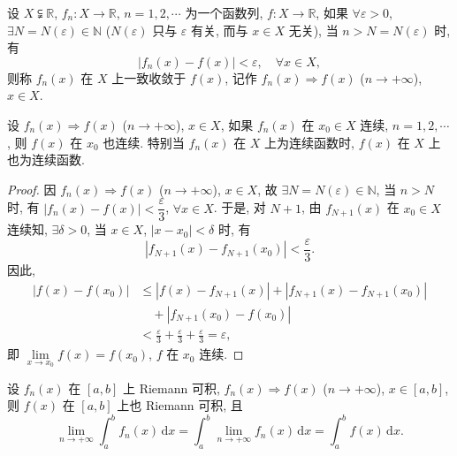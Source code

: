 \begin{definition}\label{def:6.3.1}
设 $X\subsetneqq\mathbb{R}$, $f_{n}:X\to\mathbb{R}$, $n=1,2,\cdots$ 为一个函数列, $f:X\to\mathbb{R}$, 如果 $\forall\varepsilon>0$, $\exists N=N(\varepsilon)\in\mathbb{N}$ ($N(\varepsilon)$ 只与 $\varepsilon$ 有关, 而与 $x\in X$ 无关), 当 $n>N=N(\varepsilon)$ 时, 有
\[
|f_{n}(x)-f(x)|<\varepsilon,\quad\forall x\in X,
\]
则称 $f_{n}(x)$ 在 $X$ 上一致收敛于 $f(x)$, 记作 $f_{n}(x)\Rightarrow f(x)$ ($n\to+\infty$), $x\in X$.
\end{definition}

\begin{theorem}\label{thm:6.3.5}
设 $f_{n}(x)\Rightarrow f(x)$ ($n\to+\infty$), $x\in X$, 如果 $f_{n}(x)$ 在 $x_{0}\in X$ 连续, $n=1,2,\cdots$, 则 $f(x)$ 在 $x_{0}$ 也连续. 特别当 $f_{n}(x)$ 在 $X$ 上为连续函数时, $f(x)$ 在 $X$ 上也为连续函数.
\end{theorem}

\begin{proof}
因 $f_{n}(x)\Rightarrow f(x)$ ($n\to+\infty$), $x\in X$, 故 $\exists N=N(\varepsilon)\in\mathbb{N}$, 当 $n>N$ 时, 有 $|f_{n}(x)-f(x)|<\dfrac{\varepsilon}{3}$, $\forall x\in X$. 于是, 对 $N+1$, 由 $f_{N+1}(x)$ 在 $x_{0}\in X$ 连续知, $\exists\delta>0$, 当 $x\in X$, $|x-x_{0}|<\delta$ 时, 有
\[
|f_{N+1}(x)-f_{N+1}(x_{0})|<\frac{\varepsilon}{3}.
\]
因此,
\[
\begin{aligned}
|f(x)-f(x_{0})|&\leqslant|f(x)-f_{N+1}(x)|+|f_{N+1}(x)-f_{N+1}(x_{0})|\\
&\quad+|f_{N+1}(x_{0})-f(x_{0})|\\
&<\frac{\varepsilon}{3}+\frac{\varepsilon}{3}+\frac{\varepsilon}{3}=\varepsilon,
\end{aligned}
\]
即 $\lim\limits_{x\to x_{0}}f(x)=f(x_{0})$, $f$ 在 $x_{0}$ 连续.
\end{proof}

\begin{theorem}\label{thm:6.3.6}
设 $f_{n}(x)$ 在 $[a,b]$ 上 Riemann 可积, $f_{n}(x)\Rightarrow f(x)$ ($n\to+\infty$), $x\in[a,b]$, 则 $f(x)$ 在 $[a,b]$ 上也 Riemann 可积, 且
\[
\lim_{n\to+\infty}\int_{a}^{b}f_{n}(x)\,\mathrm{d}x=\int_{a}^{b}\lim_{n\to+\infty}f_{n}(x)\,\mathrm{d}x=\int_{a}^{b}f(x)\,\mathrm{d}x.
\]
\end{theorem}

